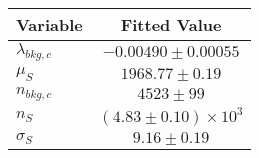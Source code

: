 \begin{tabular}[t]{lc}
\hline
Variable &Fitted Value\\
\hline\hline
$\lambda_{bkg,c}$&$-0.00490\pm0.00055$\\
\hline
$\mu_{S}$&$1968.77\pm0.19$\\
\hline
$n_{bkg,c}$&$4523\pm99$\\
\hline
$n_{S}$&$(4.83\pm0.10)\times 10^3$\\
\hline
$\sigma_{S}$&$9.16\pm0.19$\\
\hline
\end{tabular}